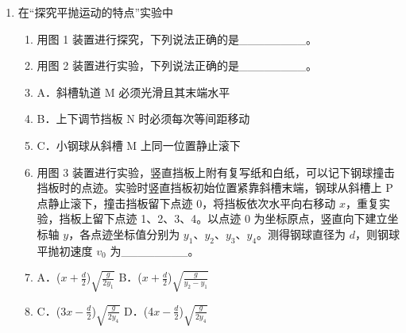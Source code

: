 \documentclass[\gkver]{gaokaozhenti}
\begin{document}
\begin{enumerate}
\item
在“探究平抛运动的特点”实验中
\begin{enumerate}
	\item
	用图 1 装置进行探究，下列说法正确的是\_\_\_\_\_\_\_\_。
	\item
	用图 2 装置进行实验，下列说法正确的是\_\_\_\_\_\_\_\_。
	\item
	A．斜槽轨道 M 必须光滑且其末端水平
	\item
	B．上下调节挡板 N 时必须每次等间距移动
	\item
	C．小钢球从斜槽 M 上同一位置静止滚下
	\item
	用图 3 装置进行实验，竖直挡板上附有复写纸和白纸，可以记下钢球撞击挡板时的点迹。实验时竖直挡板初始位置紧靠斜槽末端，钢球从斜槽上 P 点静止滚下，撞击挡板留下点迹 0，将挡板依次水平向右移动 $x$，重复实验，挡板上留下点迹 1、2、3、4。以点迹 0 为坐标原点，竖直向下建立坐标轴 $y$，各点迹坐标值分别为 $y_{1}$、$y_{2}$、$y_{3}$、$y_{4}$。测得钢球直径为 $d$，则钢球平抛初速度 $v_{0}$ 为\_\_\_\_\_\_\_\_。
	\item
	A．($x + \frac{d}{2}$)$\sqrt {\frac{g}{{2{y_1}}}} $            B．($x + \frac{d}{2}$)$\sqrt {\frac{g}{{{y_2} - {y_1}}}} $
	\item
	C．(3$x - \frac{d}{2}$)$\sqrt {\frac{g}{{2{y_4}}}} $          D．(4$x - \frac{d}{2}$)$\sqrt {\frac{g}{{2{y_4}}}} $
\end{enumerate}
\end{enumerate}
\end{document}
